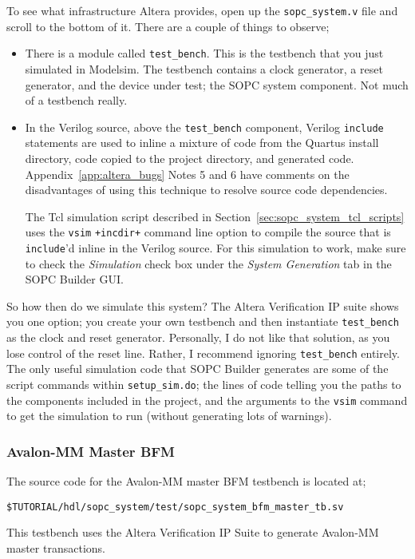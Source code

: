 \documentclass[10pt,twoside]{article}
\begin{document}
To see what infrastructure Altera provides, open up the \verb+sopc_system.v+
file and scroll to the bottom of it. There are a couple of things to
observe;
%
\begin{itemize}
\item There is a module called \verb+test_bench+. This is the testbench
that you just simulated in Modelsim. The testbench contains a clock
generator, a reset generator, and the device under test; the SOPC system
component. Not much of a testbench really.
%
\item In the Verilog source, above the \verb+test_bench+ component,
Verilog \verb+include+ statements are used to inline a mixture of code
from the Quartus install directory, code copied to the project 
directory, and generated code. Appendix~\ref{app:altera_bugs} 
Notes 5\label{bug:5} and 6\label{bug:6a}
have comments on the disadvantages of using this technique to
resolve source code dependencies.

The Tcl simulation script described in Section~\ref{sec:sopc_system_tcl_scripts}
uses the \verb+vsim+ \verb|+incdir+| command line option to compile
the source that is \verb+include+'d inline in the Verilog source.
For this simulation to work, make sure to check the {\em Simulation}
check box under the {\em System Generation} tab in the SOPC Builder GUI.
\end{itemize}

So how then do we simulate this system? The Altera Verification IP
suite shows you one option; you create your own testbench and then
instantiate \verb+test_bench+ as the clock and reset generator.
Personally, I do not like that solution, as you lose control of
the reset line. Rather, I recommend ignoring \verb+test_bench+ 
entirely. The only useful simulation code that SOPC Builder 
generates are some of the script commands within \verb+setup_sim.do+;
the lines of code telling you the paths to the components included
in the project, and the arguments to the \verb+vsim+ command to
get the simulation to run (without generating lots of warnings).

\clearpage
\subsubsection{Avalon-MM Master BFM}

The source code for the Avalon-MM master BFM testbench is
located at;
%
\begin{verbatim}
$TUTORIAL/hdl/sopc_system/test/sopc_system_bfm_master_tb.sv
\end{verbatim}
%
This testbench uses the Altera Verification IP Suite to generate
Avalon-MM master transactions.
\end{document}
